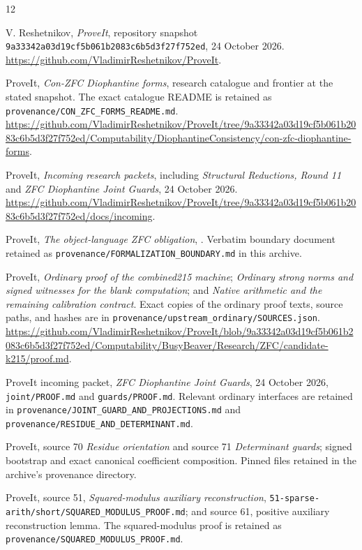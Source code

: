 \documentclass[11pt,a4paper]{article}
\theoremstyle{definition}\newtheorem{definition}[theorem]{Definition}
\theoremstyle{remark}\newtheorem{remark}[theorem]{Remark}
\numberwithin{equation}{section}
\begin{document}
\begin{thebibliography}{12}\small\raggedright
{}
V. Reshetnikov, \emph{ProveIt}, repository snapshot
\texttt{9a33342a03d19cf5b061b2083c6b5d3f27f752ed},
24 October 2026.
\url{https://github.com/VladimirReshetnikov/ProveIt}.

ProveIt, \emph{Con-ZFC Diophantine forms}, research catalogue and
frontier at the stated snapshot. The exact catalogue README is
retained as \texttt{provenance/CON\_ZFC\_FORMS\_README.md}.
\url{https://github.com/VladimirReshetnikov/ProveIt/tree/9a33342a03d19cf5b061b2083c6b5d3f27f752ed/Computability/DiophantineConsistency/con-zfc-diophantine-forms}.

ProveIt, \emph{Incoming research packets}, including
\emph{Structural Reductions, Round 11} and
\emph{ZFC Diophantine Joint Guards}, 24 October 2026.
\url{https://github.com/VladimirReshetnikov/ProveIt/tree/9a33342a03d19cf5b061b2083c6b5d3f27f752ed/docs/incoming}.

ProveIt, \emph{The object-language ZFC obligation},
.
Verbatim boundary document retained as
\texttt{provenance/FORMALIZATION\_BOUNDARY.md} in this archive.

ProveIt, \emph{Ordinary proof of the combined215 machine};
\emph{Ordinary strong norms and signed witnesses for the blank
computation}; and \emph{Native arithmetic and the remaining
calibration contract}. Exact copies of the ordinary proof texts,
source paths, and hashes are in
\texttt{provenance/upstream\_ordinary/SOURCES.json}.
\url{https://github.com/VladimirReshetnikov/ProveIt/blob/9a33342a03d19cf5b061b2083c6b5d3f27f752ed/Computability/BusyBeaver/Research/ZFC/candidate-k215/proof.md}.

ProveIt incoming packet,
\emph{ZFC Diophantine Joint Guards}, 24 October 2026,
\texttt{joint/PROOF.md} and \texttt{guards/PROOF.md}.
Relevant ordinary interfaces are retained in
\texttt{provenance/JOINT\_GUARD\_AND\_PROJECTIONS.md} and
\texttt{provenance/RESIDUE\_AND\_DETERMINANT.md}.

ProveIt, source 70 \emph{Residue orientation} and source 71
\emph{Determinant guards}; signed bootstrap and exact canonical
coefficient composition. Pinned files retained in the archive's
provenance directory.

ProveIt, source 51, \emph{Squared-modulus auxiliary reconstruction},
\texttt{51-sparse-arith/short/SQUARED\_MODULUS\_PROOF.md};
and source 61, positive auxiliary reconstruction lemma.
The squared-modulus proof is retained as
\texttt{provenance/SQUARED\_MODULUS\_PROOF.md}.


\end{thebibliography}
\end{document}
